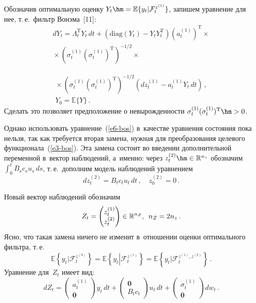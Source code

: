 \begin{multicols}{2}
     Обозначив оптимальную оценку $Y_t\hm= \mathbb{E} \{y_t \vert 
\mathcal{F}_t^{z^{(1)}}\}$, запишем уравнение для нее, т.\,е.\ фильтр 
Вонэма~[11]:
         \begin{multline*}
     dY_t= \Lambda_t^{\mathrm{T}} Y_t\,dt +\left( \mathrm{diag} \left(Y_t\right)-Y_t Y_t^{\mathrm{T}}\right) 
\left( a_t^{(1)}\right)^{\mathrm{T}} \times{}\\
{}\times \left( \sigma_t^{(1)} \left( 
\sigma_t^{(1)}\right)^{\mathrm{T}}\right)^{-1/2} \times{}
\end{multline*}

\noindent
     \begin{multline}
     {}\times 
     \left( \sigma_t^{(1)} \left( \sigma_t^{(1)}\right)^{\mathrm{T}}\right)^{-1/2} \left( 
dz_t^{(1)} -a_t^{(1)} Y_t \,dt\right) \,, \\ 
Y_0=\mathbb{E}\{Y\}\,.
     \label{e6-bos}
     \end{multline}
      Сделать это позволяет предположение о не\-вы\-рож\-ден\-ности  $\sigma_t^{(1)}(\sigma_t^{(1)})^{\mathrm{T}}\hm>0$. 
     
     Однако использовать уравнение~(\ref{e6-bos}) в~качестве уравнения состояния 
пока нельзя, так как требуется вторая замена, нужная для преобразования 
целевого функционала~(\ref{e3-bos}). Эта замена состоит во введении 
дополнительной переменной в~вектор наблюдений, а~именно: через 
$z_t^{(2)} \hm\in \mathbb{R}^{n_z}$ обозначим $\int\nolimits_0^t B_s c_s u_s 
\,ds$, т.\,е.\ дополним модель наблюдений уравнением
     $$
     dz_t^{(2)}=B_t c_t u_t \,dt\,,\quad z_0^{(2)}=0\,.
     $$
     
     Новый вектор наблюдений обозначим 
     $$
     Z_t= \begin{pmatrix} 
z_t^{(1)}\\ z_t^{(2)}\end{pmatrix} \in \mathbb{R}^{n_Z},\enskip n_Z=2n_z\,.
$$ 
Ясно, что такая замена ничего не изменит в~отношении оценки оптимального 
фильтра, т.\,е.\ 
$$
\mathbb{E}\left\{y_t\vert \mathcal{F}_t^{z^{(0)}}\right\}=\mathbb{E}
\left\{y_t\left\vert \mathcal{F}_t^{z^{(1)}}\right.\right\}=
\mathbb{E}\left\{y_t\vert 
\mathcal{F}_t^{z^{(1)},z^{(2)}}\right\}\,.
$$
 Уравнение для~$Z_t$ имеет вид:
     \begin{equation}
     dZ_t=\begin{pmatrix}
     a_t^{(1)}\\ \mathbf{0}
     \end{pmatrix} y_t \,dt +
     \begin{pmatrix}\mathbf{0}\\ B_t c_t
     \end{pmatrix} u_t \,dt+
      \begin{pmatrix}
     \sigma_t^{(1)}\\ \mathbf{0}
     \end{pmatrix} dw_t\,.
     \label{e7-bos}
     \end{equation}
     

\end{multicols}
